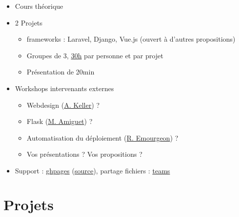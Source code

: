 \begin{itemize}
\tightlist
\item
  Cours théorique
\item
  2 Projets

  \begin{itemize}
  \tightlist
  \item
    frameworks : Laravel, Django, Vue.js (ouvert à d'autres
    propositions)
  \item
    Groupes de 3, \href{https://www.he-arc.ch/reglementation}{30h} par
    personne et par projet
  \item
    Présentation de 20min
  \end{itemize}
\item
  Workshops intervenants externes

  \begin{itemize}
  \tightlist
  \item
    Webdesign (\href{https://www.alinekeller.ch}{A. Keller}) ?
  \item
    Flask (\href{http://www.matthieuamiguet.ch/}{M. Amiguet}) ?
  \item
    Automatisation du déploiement
    (\href{https://www.linkedin.com/in/raphaelemourgeon/}{R. Emourgeon})
    ?
  \item
    {Vos présentations ? Vos propositions ?}
  \end{itemize}
\item
  Support : \href{https://he-arc.github.io/slides-devweb/}{ghpages}
  (\href{https://github.com/HE-Arc/slides-devweb/tree/master/src}{source}),
  partage fichiers :
  \href{https://teams.microsoft.com/l/team/19\%3ahGPvEcXl8HCohGre1MLq7AQ4qPWNkY_JqMTTPMPLM-I1\%40thread.tacv2/conversations?groupId=cadc33cc-9fc8-49d7-b951-aa26d534e15f\&tenantId=5b3b7d7d-e119-4d05-9022-f775f2e48e96}{teams}
\end{itemize}

\hypertarget{projets}{%
\section{Projets}\label{projets}}

